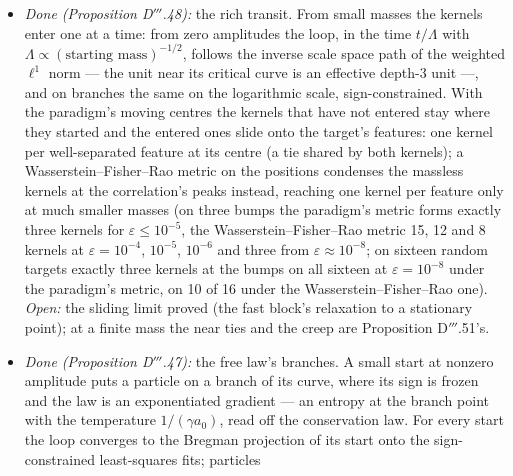 \begin{enumerate}[label=\arabic*.,leftmargin=*]
\begin{itemize}
      full Hessian; for a scalar amplitude the residual curvature scales exactly by $q_k/w_k$ under the gauge, so the
      adaptive prior's splitting margins are $\sigma_0 - (q_k/w_k)\lambda^+_k$. \emph{Open:} critical points at
      infinity (the best approximant on the saturation boundary, as for a sharp friction step, a cogging function that
      two kernels fit as a dipole, or Proposition D$'''$.29's servo globally), where only the projected prior keeps the
      parameters bounded; vector amplitudes, where the margins have no closed form.
    \item \emph{Done (Proposition D$'''$.48):} the rich transit. From small masses the kernels enter one at a time: from
      zero amplitudes the loop, in the time $t/\Lambda$ with $\Lambda\propto(\text{starting mass})^{-1/2}$, follows the
      inverse scale space path of the weighted $\ell^1$ norm --- the unit near its critical curve is an effective
      depth-3 unit ---, and on branches the same on the logarithmic scale, sign-constrained. With the paradigm's moving
      centres the kernels that have not entered stay where they started and the entered ones slide onto the target's
      features: one kernel per well-separated feature at its centre (a tie shared by both kernels); a
      Wasserstein--Fisher--Rao metric on the positions condenses the massless kernels at the correlation's peaks
      instead, reaching one kernel per feature only at much smaller masses (on three bumps the paradigm's metric forms
      exactly three kernels for $\varepsilon\le10^{-5}$, the Wasserstein--Fisher--Rao metric 15, 12 and 8 kernels at
      $\varepsilon = 10^{-4}$, $10^{-5}$, $10^{-6}$ and three from $\varepsilon\approx10^{-8}$; on sixteen random
      targets exactly three kernels at the bumps on all sixteen at $\varepsilon = 10^{-8}$ under the paradigm's metric,
      on 10 of 16 under the Wasserstein--Fisher--Rao one). \emph{Open:} the sliding limit proved (the fast block's
      relaxation to a stationary point); at a finite mass the near ties and the creep are Proposition D$'''$.51's.
    \item \emph{Done (Proposition D$'''$.47):} the free law's branches. A small start at nonzero amplitude puts a
      particle on a branch of its curve, where its sign is frozen and the law is an exponentiated gradient --- an
      entropy at the branch point with the temperature $1/(\gamma a_0)$, read off the conservation law. For every start
      the loop converges to the Bregman projection of its start onto the sign-constrained least-squares fits; particles

\end{itemize}
\end{enumerate}
